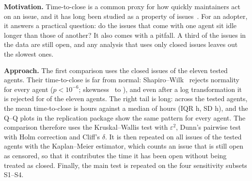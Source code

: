 \textbf{Motivation.} Time-to-close is a common proxy for how quickly maintainers act on an issue, and it has long been studied as a property of issues~\cite{kikas2016lifetime}. For an adopter, it answers a practical question: do the issues that come with one agent sit idle longer than those of another? It also comes with a pitfall. A third of the issues in the data are still open, and any analysis that uses only closed issues leaves out the slowest ones.

\textbf{Approach.} The first comparison uses the \NRQTwo{} closed issues of the eleven tested agents. Their time-to-close is far from normal: Shapiro--Wilk~\cite{shapiro1965normality} rejects normality for every agent (\(p < 10^{-6}\); skewness \SkewMin\ to \SkewMax), and even after a log transformation it is rejected for \NNonNormalLog{} of the eleven agents. The right tail is long: across the tested agents, the mean time-to-close is \TTCMeanAll{} hours against a median of \TTCMedianAll{} hours (IQR \TTCIQRAll{} h, SD \TTCSDAll{} h), and the Q--Q plots in the replication package show the same pattern for every agent. The comparison therefore uses the Kruskal--Wallis test with \(\varepsilon^2\), Dunn's pairwise test with Holm correction and Cliff's \(\delta\). It is then repeated on all issues of the tested agents with the Kaplan--Meier estimator, which counts an issue that is still open as censored, so that it contributes the time it has been open without being treated as closed. Finally, the main test is repeated on the four sensitivity subsets S1--S4.

\begin{table}[t]
\caption{Time-to-close per agent. Closed issues: count, median in hours with exact 95\% CI, rank. All issues: \% still open, Kaplan--Meier (KM) median in days (n.r.\ = 50\% closed never reached), rank}\label{tab:rq2}
\centering\footnotesize\setlength{\tabcolsep}{2.5pt}
\end{table}

